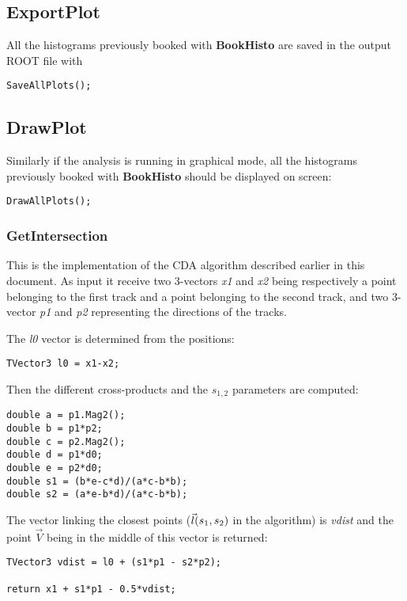 \documentclass{article}
\newcommand{\method}[1]{\textbf{#1}}
\newcommand{\var}[1]{\textit{#1}}
\begin{document}
\subsection{ExportPlot}
All the histograms previously booked with \method{BookHisto} are saved in the output ROOT file with

\begin{lstlisting}
SaveAllPlots();
\end{lstlisting} 

\subsection{DrawPlot}
Similarly if the analysis is running in graphical mode, all the histograms previously booked with
\method{BookHisto} should be displayed on screen:

\begin{lstlisting}
DrawAllPlots();
\end{lstlisting} 

\subsubsection{GetIntersection}\label{GetIntersection}
This is the implementation of the CDA algorithm described earlier in this document. As input it
receive two 3-vectors \var{x1} and \var{x2} being respectively a point belonging to the first track
and a point belonging to the second track, and two 3-vector \var{p1} and \var{p2} representing the
directions of the tracks.

The \var{l0} vector is determined from the positions: 
\begin{lstlisting}
TVector3 l0 = x1-x2;
\end{lstlisting}
Then the different cross-products and the $s_{1,2}$ parameters are computed:
\begin{lstlisting}
double a = p1.Mag2();
double b = p1*p2;
double c = p2.Mag2();
double d = p1*d0;
double e = p2*d0;
double s1 = (b*e-c*d)/(a*c-b*b);
double s2 = (a*e-b*d)/(a*c-b*b);
\end{lstlisting}
The vector linking the closest points ($\vec{l}(s_1, s_2)$ in the algorithm) is \var{vdist} and the
point $\vec{V}$ being in the middle of this vector is returned:
\begin{lstlisting}
TVector3 vdist = l0 + (s1*p1 - s2*p2);

return x1 + s1*p1 - 0.5*vdist;
\end{lstlisting}
\end{document}
